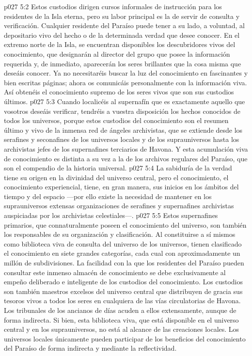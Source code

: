 \vs p027 5:2 Estos custodios dirigen cursos informales de instrucción para los residentes de la Isla eterna, pero su labor principal es la de servir de consulta y verificación. Cualquier residente del Paraíso puede tener a su lado, a voluntad, al depositario vivo del hecho o de la determinada verdad que desee conocer. En el extremo norte de la Isla, se encuentran disponibles los descubridores vivos del conocimiento, que designarán al director del grupo que posee la información requerida y, de inmediato, aparecerán los seres brillantes que  la cosa misma que deseáis conocer. Ya no necesitaréis buscar la luz del conocimiento en fascinantes y bien escritas páginas; ahora os comunicáis personalmente con la información viva. Así obtenéis el conocimiento supremo de los seres vivos que son sus custodios últimos.
\vs p027 5:3 Cuando localicéis al supernafín que es exactamente aquello que vosotros deseáis verificar, tendréis a vuestra disposición  los hechos conocidos de todos los universos, porque estos custodios del conocimiento son el resumen último y vivo de la inmensa red de ángeles archivistas, que se extiende desde los serafines y seconafines de los universos locales y de los suprauniversos hasta los archivistas jefes de los supernafines terciarios de Havona. Y esta acumulación viva de conocimiento es distinta a su vez a la de los archivos regulares del Paraíso, que son el compendio de la historia universal.
\vs p027 5:4 La sabiduría de la verdad tiene su origen en la divinidad del universo central, pero el conocimiento, el conocimiento experiencial, tiene, en gran manera, sus inicios en los ámbitos del tiempo y del espacio ---por ello existe la necesidad de mantener en los suprauniversos extensas organizaciones de serafines y supernafines archivistas auspiciadas por los archivistas celestiales---.
\vs p027 5:5 Estos supernafines primarios, que connaturalmente poseen el conocimiento del universo, son también los responsables de su organización y clasificación. Al constituirse a sí mismos como biblioteca viva de consulta del universo de los universos, tienen clasificado el conocimiento en siete grandes categorías, cada cual con aproximadamente un millón de subdivisiones. La facilidad con la que los residentes del Paraíso pueden consultar este inmenso almacén de conocimiento se debe exclusivamente al empeño deliberado e inteligente de los custodios del conocimiento. Los custodios son también maestros excelsos del universo central que distribuyen de gracia sus tesoros vivos a todos los seres en cualquiera de las vías circulatorias de Havona. Los tribunales de los ancianos de días acuden a ellos extensamente, aunque de forma indirecta. Si bien, esta biblioteca viva, que está disponible en el universo central y en los suprauniversos, no está al alcance de las creaciones locales. Los universos locales únicamente pueden participar de los beneficios del conocimiento del Paraíso de forma indirecta y mediante la reflectividad.
